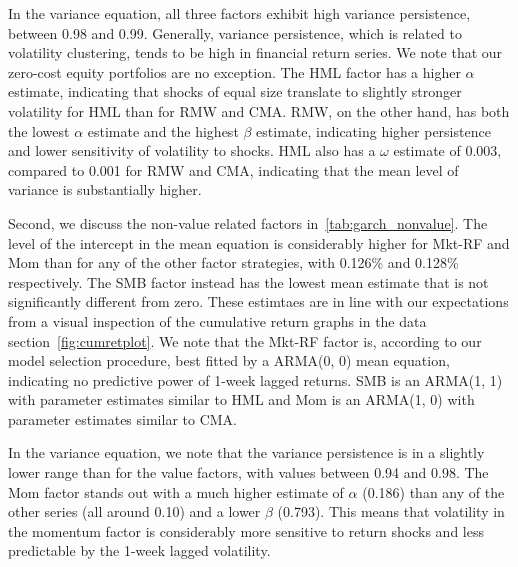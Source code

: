 In the variance equation, all three factors exhibit high variance persistence, between 0.98 and 0.99. Generally, variance persistence, which is related to volatility clustering, tends to be high in financial return series. We note that our zero-cost equity portfolios are no exception. The HML factor has a higher $\alpha$ estimate, indicating that shocks of equal size translate to slightly stronger volatility for HML than for RMW and CMA. RMW, on the other hand, has both the lowest $\alpha$ estimate and the highest $\beta$ estimate, indicating higher persistence and lower sensitivity of volatility to shocks. HML also has a $\omega$ estimate of 0.003, compared to 0.001 for RMW and CMA, indicating that the mean level of variance is substantially higher.

Second, we discuss the non-value related factors in~\autoref{tab:garch_nonvalue}. The level of the intercept in the mean equation is considerably higher for Mkt-RF and Mom than for any of the other factor strategies, with 0.126\% and 0.128\% respectively. The SMB factor instead has the lowest mean estimate that is not significantly different from zero. These estimtaes are in line with our expectations from a visual inspection of the cumulative return graphs in the data section~\autoref{fig:cumretplot}. We note that the Mkt-RF factor is, according to our model selection procedure, best fitted by a ARMA(0, 0) mean equation, indicating no predictive power of 1-week lagged returns. SMB is an ARMA(1, 1) with parameter estimates similar to HML and Mom is an ARMA(1, 0) with parameter estimates similar to CMA.

In the variance equation, we note that the variance persistence is in a slightly lower range than for the value factors, with values between 0.94 and 0.98. The Mom factor stands out with a much higher estimate of $\alpha$ (0.186) than any of the other series (all around 0.10) and a lower $\beta$ (0.793). This means that volatility in the momentum factor is considerably more sensitive to return shocks and less predictable by the 1-week lagged volatility.







